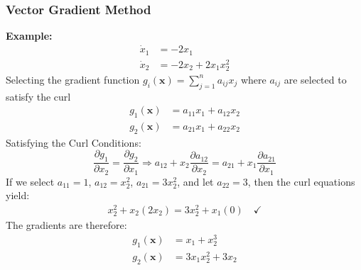 \documentclass[11pt,handout]{beamer}   %
\begin{document}
\begin{frame}
\frametitle{Vector Gradient Method}
\small
\textbf{Example:}
\begin{equation*}
\begin{aligned}
\dot{x}_1 &= -2 x_1\\
\dot{x}_2 &= -2 x_2 + 2x_1 x_2 ^2
\end{aligned}
\end{equation*}
Selecting the gradient function $g_i(\mathbf{x}) = \sum_{j = 1}^{n} a_{ij} x_j$ where $a_{ij}$ are selected to satisfy the curl
\begin{equation*}
\begin{aligned}
g_1(\mathbf{x}) &= a_{11} x_1 + a_{12} x_2\\
g_2(\mathbf{x}) &= a_{21} x_1 + a_{22} x_2
\end{aligned}
\end{equation*}
Satisfying the Curl Conditions:
\begin{equation*}
\frac{\partial g_1}{\partial x_2} = \frac{\partial g_2}{\partial x_1} \Rightarrow a_{12} + x_2 \frac{\partial a_{12}}{\partial x_2} = a_{21} +  x_1 \frac{\partial a_{21}}{\partial x_1} 
\end{equation*}
If we select $a_{11} = 1$, $a_{12} = x_2^2$,  $a_{21} = 3x_2^2$, and let $a_{22} = 3$, then the curl equations yield:
\begin{equation*}
\begin{aligned}
x_2^2 + x_2(2 x_2) = 3 x_2^2 + x_1(0) \quad \checkmark
\end{aligned}
\end{equation*}
The gradients are therefore:
\begin{equation*}
\begin{aligned}
g_1(\mathbf{x}) &= x_1 + x_2^3\\
g_2(\mathbf{x}) &= 3x_1 x_2^2 + 3x_2
\end{aligned}
\end{equation*}
\end{frame}
\end{document}
